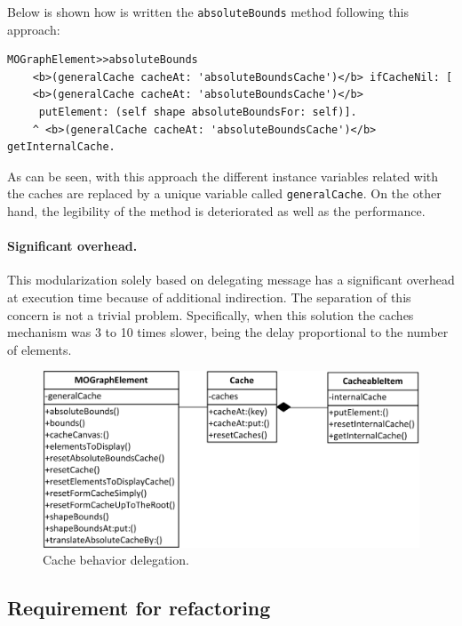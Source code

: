 \documentclass[preprint,10pt]{sigplanconf}
\newcommand{\ct}{\lstinline[backgroundcolor=\color{white},basicstyle=\footnotesize\ttfamily]}
\begin{document}
Below is shown how is written the \ct{absoluteBounds} method following this approach:  
\begin{lstlisting} 
MOGraphElement>>absoluteBounds
	<b>(generalCache cacheAt: 'absoluteBoundsCache')</b> ifCacheNil: [
	<b>(generalCache cacheAt: 'absoluteBoundsCache')</b>
	 putElement: (self shape absoluteBoundsFor: self)].
	^ <b>(generalCache cacheAt: 'absoluteBoundsCache')</b> getInternalCache.
\end{lstlisting}
As can be seen, with this approach the different instance variables related with the caches are replaced by a unique variable called \ct{generalCache}. On the other hand, the legibility of the method is deteriorated as well as the performance.

\paragraph{Significant overhead.} This modularization solely based on delegating message has a significant overhead at execution time
because of additional indirection.
The separation of this concern is not a trivial problem. Specifically,
when this solution the caches mechanism was 3 to 10 times slower,
being the delay proportional to the number of elements.

%
\begin{figure}
\begin{centering}
\includegraphics[bb=27bp 615bp 338bp 762bp,scale=0.97]{CacheMechanisms} 
\par\end{centering}

\caption{Cache behavior delegation.\label{fig:Cache-behaviour-delegation}}

\end{figure}


\subsection{Requirement for refactoring}
\end{document}
